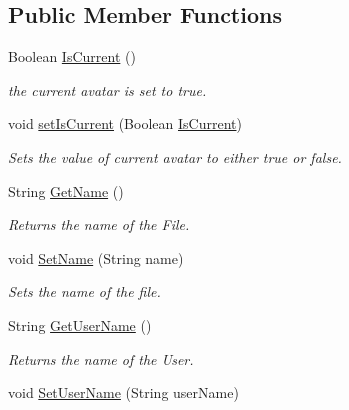 \subsection*{Public Member Functions}
\begin{DoxyCompactItemize}
\item 
Boolean \hyperlink{classcom_1_1shephertz_1_1app42_1_1paas_1_1sdk_1_1csharp_1_1avatar_1_1_avatar_a5adc45d14c0dbd593fa7fe7735b1bda0}{Is\+Current} ()
\begin{DoxyCompactList}\small\item\em the current avatar is set to true. \end{DoxyCompactList}\item 
void \hyperlink{classcom_1_1shephertz_1_1app42_1_1paas_1_1sdk_1_1csharp_1_1avatar_1_1_avatar_ae75ff44c05d042c6a3a76b613d99254f}{set\+Is\+Current} (Boolean \hyperlink{classcom_1_1shephertz_1_1app42_1_1paas_1_1sdk_1_1csharp_1_1avatar_1_1_avatar_a5adc45d14c0dbd593fa7fe7735b1bda0}{Is\+Current})
\begin{DoxyCompactList}\small\item\em Sets the value of current avatar to either true or false. \end{DoxyCompactList}\item 
String \hyperlink{classcom_1_1shephertz_1_1app42_1_1paas_1_1sdk_1_1csharp_1_1avatar_1_1_avatar_ae144e19c49aa60edb741110352ad74f2}{Get\+Name} ()
\begin{DoxyCompactList}\small\item\em Returns the name of the File. \end{DoxyCompactList}\item 
void \hyperlink{classcom_1_1shephertz_1_1app42_1_1paas_1_1sdk_1_1csharp_1_1avatar_1_1_avatar_a6815b21ad33f9470033021f49cf25b31}{Set\+Name} (String name)
\begin{DoxyCompactList}\small\item\em Sets the name of the file. \end{DoxyCompactList}\item 
String \hyperlink{classcom_1_1shephertz_1_1app42_1_1paas_1_1sdk_1_1csharp_1_1avatar_1_1_avatar_a0597acf1dad64622952344741a733408}{Get\+User\+Name} ()
\begin{DoxyCompactList}\small\item\em Returns the name of the User. \end{DoxyCompactList}\item 
void \hyperlink{classcom_1_1shephertz_1_1app42_1_1paas_1_1sdk_1_1csharp_1_1avatar_1_1_avatar_ac2719ec67473ead829db959e536efaa8}{Set\+User\+Name} (String user\+Name)

\end{DoxyCompactItemize}
